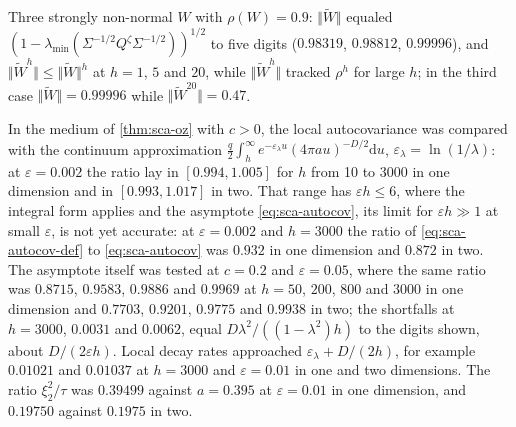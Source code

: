 \begin{numcheck}[Persistence]\label{chk:sca-persistence}
Three strongly non-normal $W$ with $\rho(W)=0.9$: $\Vert\tilde W\Vert$ equaled $(1-\lambda_{\min}(\Sigma^{-1/2}Q^\zeta\Sigma^{-1/2}))^{1/2}$ to five digits ($0.98319$, $0.98812$, $0.99996$), and $\Vert\tilde W^h\Vert\le\Vert\tilde W\Vert^h$ at $h=1$, $5$ and $20$, while $\Vert\tilde W^h\Vert$ tracked $\rho^h$ for large $h$; in the third case $\Vert\tilde W\Vert=0.99996$ while $\Vert\tilde W^{20}\Vert=0.47$.
\end{numcheck}

\begin{numcheck}\label{chk:sca-autocovariance}
In the medium of \cref{thm:sca-oz} with $c>0$, the local autocovariance was compared with the continuum approximation $\frac q2\int_h^\infty e^{-\varepsilon_\lambda u}(4\pi au)^{-D/2}\mathrm{d}u$, $\varepsilon_\lambda=\ln(1/\lambda)$: at $\varepsilon=0.002$ the ratio lay in $[0.994,1.005]$ for $h$ from 10 to 3000 in one dimension and in $[0.993,1.017]$ in two. That range has $\varepsilon h\le6$, where the integral form applies and the asymptote \eqref{eq:sca-autocov}, its limit for $\varepsilon h\gg1$ at small $\varepsilon$, is not yet accurate: at $\varepsilon=0.002$ and $h=3000$ the ratio of \eqref{eq:sca-autocov-def} to \eqref{eq:sca-autocov} was $0.932$ in one dimension and $0.872$ in two. The asymptote itself was tested at $c=0.2$ and $\varepsilon=0.05$, where the same ratio was $0.8715$, $0.9583$, $0.9886$ and $0.9969$ at $h=50$, $200$, $800$ and $3000$ in one dimension and $0.7703$, $0.9201$, $0.9775$ and $0.9938$ in two; the shortfalls at $h=3000$, $0.0031$ and $0.0062$, equal $D\lambda^2/((1-\lambda^2)h)$ to the digits shown, about $D/(2\varepsilon h)$. Local decay rates approached $\varepsilon_\lambda+D/(2h)$, for example $0.01021$ and $0.01037$ at $h=3000$ and $\varepsilon=0.01$ in one and two dimensions. The ratio $\xi_2^2/\tau$ was $0.39499$ against $a=0.395$ at $\varepsilon=0.01$ in one dimension, and $0.19750$ against $0.1975$ in two.
\end{numcheck}

